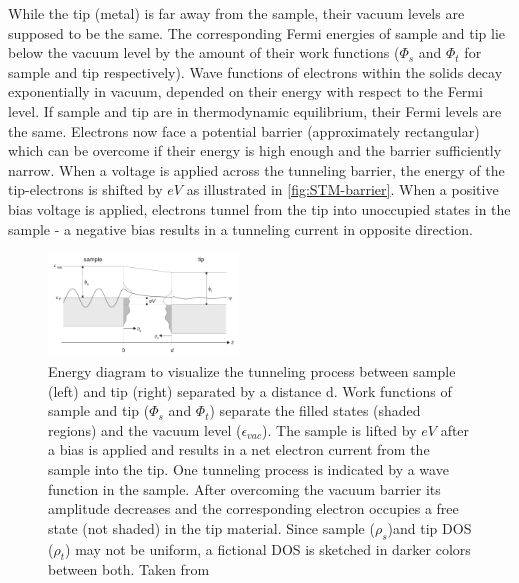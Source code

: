 While the tip (metal) is far away from the sample, their vacuum levels are supposed to be the same. The corresponding Fermi energies of sample and tip lie below the vacuum level by the amount of their work functions ($\Phi_s$ and $\Phi_t$ for sample and tip respectively). Wave functions of electrons within the solids decay exponentially in vacuum, depended on their energy with respect to the Fermi level.
If sample and tip are in thermodynamic equilibrium, their Fermi levels are the same. Electrons now face a potential barrier (approximately rectangular) which can be overcome if their energy is high enough and the barrier sufficiently narrow. When a voltage is applied across the tunneling barrier, the energy of the tip-electrons is shifted by $eV$ as illustrated in \autoref{fig:STM-barrier}. When a positive bias voltage is applied, electrons tunnel from the tip into unoccupied states in the sample - a negative bias results in a tunneling current in opposite direction. 

\begin{figure}[ht]
	\begin{center}
		\includegraphics[width=0.45\textwidth]{./images/tunnel-barrier.jpg}
	\end{center}
	\caption{Energy diagram to visualize the tunneling process between sample (left) and tip (right) separated by a distance d. Work functions of sample and tip ($\Phi_s$ and $\Phi_t$) separate the filled states (shaded regions) and the vacuum level ($\epsilon_{vac}$). The sample is lifted by $eV$ after a bias is applied and results in a net electron current from the sample into the tip. One tunneling process is indicated by a wave function in the sample. After overcoming the vacuum barrier its amplitude decreases and the corresponding electron occupies a free state (not shaded) in the tip material. Since sample ($\rho_s$)and tip DOS ($\rho_t$) may not be uniform, a fictional DOS is sketched in darker colors between both. Taken from \cite{diss-schunack}}
	\label{fig:STM-barrier}
\end{figure}


